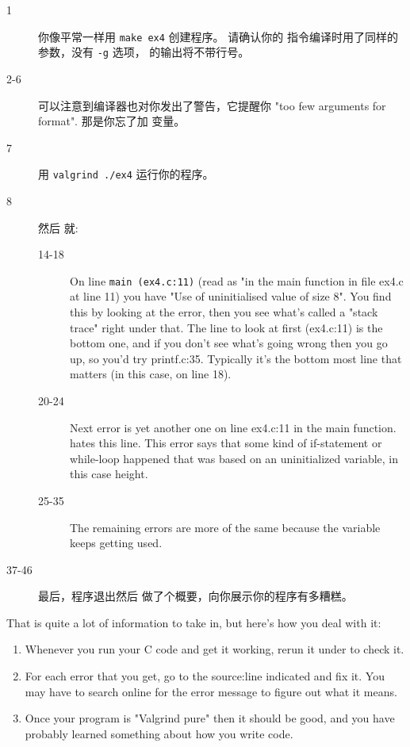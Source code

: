 \begin{description}
\item[1] 你像平常一样用 \verb|make ex4| 创建程序。 请确认你的  指令编译时用了同样的参数，没有 \verb|-g| 选项， 的输出将不带行号。
\item[2-6] 可以注意到编译器也对你发出了警告，它提醒你 "too few arguments for format". 那是你忘了加  变量。
\item[7] 用 \verb|valgrind ./ex4| 运行你的程序。
\item[8] 然后  就:
    \begin{description}
        \item[14-18] On line \verb|main (ex4.c:11)| (read as "in the main function in
            file ex4.c at line 11) you have "Use of uninitialised value of size 8".
            You find this by looking at the error, then you see what's called a "stack trace"
            right under that.  The line to look at first (ex4.c:11) is the bottom one, 
            and if you don't see what's going wrong then you go up, so you'd try
            printf.c:35.  Typically it's the bottom most line that matters (in this case, on line 18).
        \item[20-24] Next error is yet another one on line ex4.c:11 in the main function. 
            hates this line.  This error says that some kind of if-statement or while-loop
            happened that was based on an uninitialized variable, in this case height.
        \item[25-35] The remaining errors are more of the same because the variable keeps getting
        used.
    \end{description}
\item[37-46] 最后，程序退出然后  做了个概要，向你展示你的程序有多糟糕。
\end{description}

That is quite a lot of information to take in, but here's how you deal with it:

\begin{enumerate}
\item Whenever you run your C code and get it working, rerun it under 
    to check it.
\item For each error that you get, go to the source:line indicated and
    fix it.  You may have to search online for the error message to figure out
    what it means.
\item Once your program is "Valgrind pure" then it should be good, and you
    have probably learned something about how you write code.
\end{enumerate}


